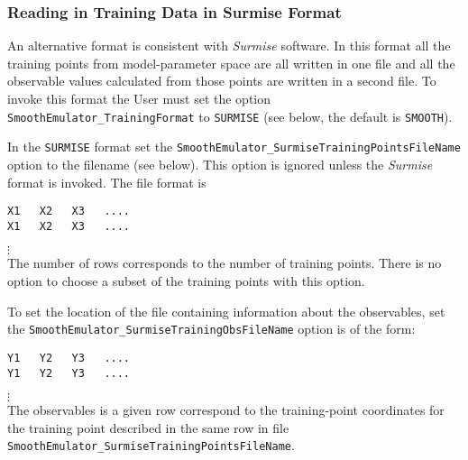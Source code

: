 \documentclass[UserManual.tex]{subfiles}
\begin{document}
\begin{enumerate}
\subsubsection{Reading in Training Data in Surmise Format}
An alternative format is consistent with {\it Surmise} software. In this format all the training points from model-parameter space are all written in one file and all the observable values calculated from those points are written in a second file. To invoke this format the User must set the option {\tt SmoothEmulator\_TrainingFormat} to {\tt SURMISE} (see below, the default is {\tt SMOOTH}).

In the {\tt SURMISE} format set the  {\tt SmoothEmulator\_SurmiseTrainingPointsFileName} option to the filename (see below). This option is ignored unless the {\it Surmise} format is invoked. The file format is\\
\vspace*{-8pt}
{\tt\begin{verbatim}
X1   X2   X3   ....
X1   X2   X3   ....
\end{verbatim}}
\vspace*{-16pt}
 \hspace*{28pt}$\vdots$\\
The number of rows corresponds to the number of training points. There is no option to choose a subset of the training points with this option. 

To set the location of the file containing information about the observables, set the {\tt SmoothEmulator\_SurmiseTrainingObsFileName} option is of the form:\\
\vspace*{-8pt}
{\tt\begin{verbatim}
Y1   Y2   Y3   ....
Y1   Y2   Y3   ....
\end{verbatim}}
\vspace*{-16pt}
 \hspace*{28pt}$\vdots$\\
The observables is a given row correspond to the training-point coordinates for the training point described in the same row in file {\tt SmoothEmulator\_SurmiseTrainingPointsFileName}.


\end{enumerate}
\end{document}
